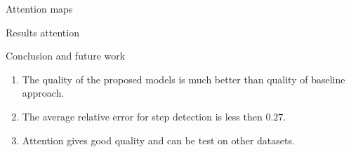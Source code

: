 \documentclass[9pt,pdf,hyperref={unicode}]{beamer}
\begin{document}
\begin{frame}[shrink=5]{Attention maps}
\begin{figure}
\begin{minipage}[!h]{1\linewidth}
\end{minipage}

\end{figure}





\end{frame}

\begin{frame}[shrink=5]{Results attention}
\begin{figure}
\begin{minipage}[!h]{1\linewidth}
\end{minipage}

\end{figure}





\end{frame}

\begin{frame}{Conclusion and future work}
\justifying

	\begin{enumerate}
	\justifying
	\item The quality of the proposed models is much better than quality of baseline approach.
	\item The average relative error for step detection is less then $0.27$.
    \item Attention gives good quality and can be test on other datasets.
	\end{enumerate}
	


\end{frame}
\end{document}
